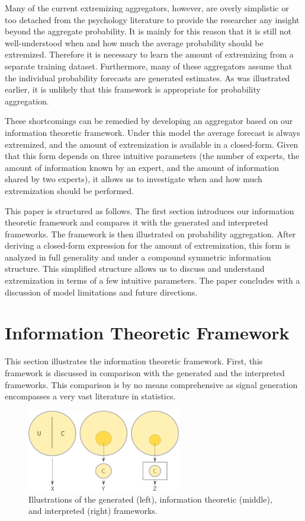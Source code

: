 \documentclass[11pt,twoside]{article}
\begin{document}
Many of the current extremizing aggregators, however, are overly simplistic or too detached from the psychology literature to provide the researcher any insight beyond the aggregate probability. It is mainly for this reason that it is still not well-understood when and how much the average probability should be extremized. Therefore it is necessary to learn the amount of extremizing from a separate training dataset. Furthermore, many of these aggregators assume that the individual probability forecasts are generated estimates. As was illustrated earlier, it is unlikely that this framework is appropriate for probability aggregation.

These shortcomings can be remedied by developing an aggregator based on our information theoretic framework. Under this model the average forecast is always extremized, and the amount of extremization is available in a closed-form. Given that this form depends on three intuitive parameters (the number of experts, the amount of information known by an expert, and the amount of information shared by two experts), it allows us to investigate when and how much extremization should be performed. 

This paper is structured as follows. The first section introduces our information theoretic framework and  compares it with the generated and interpreted frameworks. The framework is then illustrated on probability aggregation. After deriving a closed-form expression for the amount of extremization, this form is analyzed in full generality and under a compound symmetric information structure. This simplified structure allows us to discuss and understand extremization in terms of a few intuitive parameters. The paper concludes with a discussion of  model limitations and future directions. 



\section{Information Theoretic Framework}
This section illustrates the information theoretic framework. First, this framework is discussed in comparison with the generated and the interpreted frameworks. This comparison is by no means comprehensive as signal generation encompasses a very vast literature in statistics. 

\begin{figure}[htbp]
   \centering
   \includegraphics[width = 0.6\textwidth]{regression} %
   \caption{Illustrations of the generated (left), information theoretic (middle), and interpreted (right) frameworks.}
   \label{framework}
\end{figure}
\end{document}
